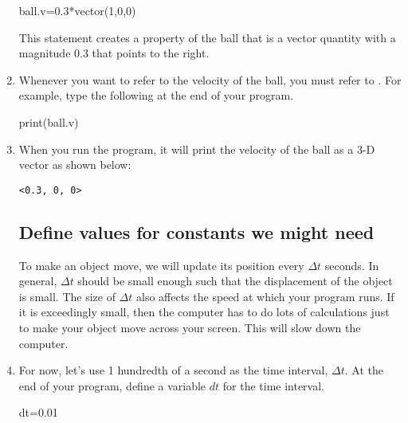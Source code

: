 \begin{enumerate}
\begin{myvpython}
ball.v=0.3*vector(1,0,0)
\end{myvpython}

This statement creates a property of the ball   that is a vector quantity with a magnitude 0.3 that points to the right. 

\item Whenever you want to refer to the velocity of the ball, you must refer to . For example, type the following at the end of your program.

\begin{myvpython}
print(ball.v)
\end{myvpython}

\item When you run the program, it will print the velocity of the ball as a 3-D vector as shown below:

\begin{verbatim}
<0.3, 0, 0>
\end{verbatim}

\subsection*{Define values for constants we might need}

% 
 
To make an object move, we will update its position every $\Delta t$ seconds. In general, $\Delta t$ should be small enough such that the displacement of the object is small. The size of $\Delta t$ also affects the speed at which your program runs. If it is exceedingly small, then the computer has to do lots of calculations just to make your object move across your screen. This will slow down the computer.

\item For now, let's use 1 hundredth of a second as the time interval, $\Delta t$. At the end of your program, define a variable $dt$ for the time interval.

\begin{myvpython}
dt=0.01
\end{myvpython}


\end{enumerate}

